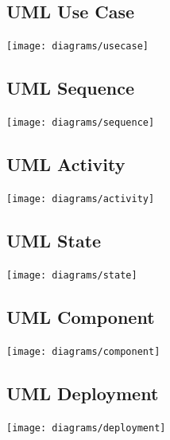 \documentclass[en, listings]{labreport}
\begin{document}
\subsection*{UML Use Case}
\noindent
\texttt{[image: diagrams/usecase]}

\subsection*{UML Sequence}
\noindent
\texttt{[image: diagrams/sequence]}

\subsection*{UML Activity}
\noindent
\texttt{[image: diagrams/activity]}

\begin{multicols}{2}

\subsection*{UML State}
\noindent
\texttt{[image: diagrams/state]}

\subsection*{UML Component}
\noindent
\texttt{[image: diagrams/component]}

\end{multicols}

\subsection*{UML Deployment}
\noindent
\texttt{[image: diagrams/deployment]}
\end{document}
